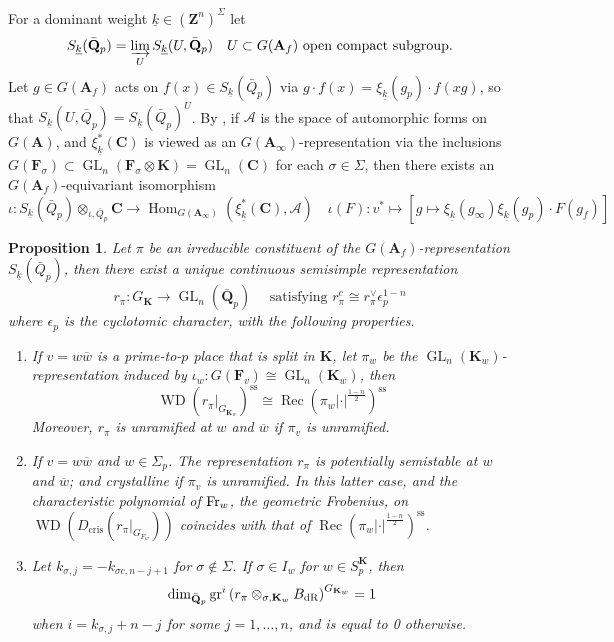 \documentclass[leqno]{amsart}
\newcommand{\wt}[1]{\underline{ #1 }}
\newcommand{\bw}{\overline{w}}
\newcommand{\Fr}{\textnormal{Fr}} %
\newcommand{\dR}{\textnormal{dR}}
\DeclareMathOperator{\WD}{WD}
\DeclareMathOperator{\Rec}{Rec}
\DeclareMathOperator{\GL}{GL}
\newcommand{\Q}{{\mathbf{Q}}}
\newcommand{\Z}{{\mathbf{Z}}}
\newcommand{\C}{\mathbf C}
\newcommand{\A}{\mathbf A}
\newcommand{\F}{{\mathbf{F}}} %
\newcommand{\K}{{\mathbf{K}}} %
\DeclareMathOperator{\Hom}{Hom}
\newtheorem{prop}[thm]{Proposition}
\theoremstyle{definition}
\theoremstyle{remark}
\begin{document}
For a dominant weight $\wt{k}\in (\Z^n)^{\Sigma}$ let
\[
	S_{\wt{k}}(\bar{\Q}_p)=\varinjlim_{U}
	S_{\wt{k}}(U,\bar{\Q}_p)\quad
	U\subset G(\A_f) \text{ open compact subgroup}.
\]
Let $g\in G(\A_f)$ acts on
$f(x)\in S_{\wt{k}}(\bar{Q}_p)$ via 
$g\cdot f(x)=\xi_{\wt{k}}(g_p)\cdot f(xg)$,
so that $S_{\wt{k}}(U,\bar{Q}_p)=S_{\wt{k}}(\bar{Q}_p)^U$.
By \cite[Prop 3.3.2]{CHT},
if $\mathcal{A}$ is 
the space of automorphic forms on $G(\A)$, 
and $\xi_{\wt{k}}^*(\C)$ is viewed as an
$G(\A_\infty)$-representation
via the inclusions
$G(\F_\sigma)\subset \GL_n(\F_\sigma\otimes \K)=\GL_n(\C)$
for each $\sigma\in \Sigma$, then
there exists an $G(\A_f)$-equivariant isomorphism
\[
	\iota\colon S_{\wt{k}}(\bar{Q}_p)\otimes_{\iota,\bar{Q}_p}\C
	\rightarrow \Hom_{G(\A_\infty)} (\xi_{\wt{k}}^*(\C), \mathcal{A})\quad
	\iota(F)\colon v^*\mapsto 
	[g\mapsto \xi_{\wt{k}}(g_\infty)\xi_{\wt{k}}(g_p)\cdot F(g_f)]
\]


\begin{prop}\cite[Prop.2.27]{ger}
	Let $\pi$ be an irreducible constituent of the
	$G(\A_f)$-representation $S_{\wt{k}}(\bar{Q}_p)$,
	then there exist a unique 
	continuous semisimple representation
	\[
	r_\pi: G_\K \rightarrow \GL_n(\bar{\Q}_p)\quad
	\text{ satisfying }
	r_\pi^c \cong r_\pi^{\vee} \epsilon_p^{1-n}
	\]
	where $\epsilon_p$ is the cyclotomic character,
	with the following properties.
\begin{enumerate}[label=(\alph*)]
\item If $v=w\bw$ is a prime-to-$p$ place that is split in $\K$,
let $\pi_w$ be the $\GL_n(\K_w)$-representation
induced by $\iota_w\colon G(\F_v)\cong \GL_n(\K_w)$, then
\[
\WD\left(\left.r_\pi\right|_{G_{\K_w}}\right)^{\mathrm{ss}} \cong
\Rec(\pi_w|\cdot|^{\frac{1-n}{2}})^{\mathrm{ss}}
\]
Moreover, $r_\pi$ is unramified at $w$ and $\bw$ if $\pi_v$ is unramified.
\item If $v=w\bw$ and  $w\in \Sigma_p$.
The representation $r_\pi$ is potentially semistable at $w$ and  $\bw$;
and crystalline if $\pi_v$ is unramified.
In this latter case, 
and the characteristic polynomial of $\Fr_w$, the geometric Frobenius,
on $\WD\left(D_{\mathrm{cris }}\left(\left.r_\pi\right|_{G_{F_w}}\right)\right)$
coincides with that of $\Rec(\pi_w|\cdot|^{\frac{1-n}{2}})^{\mathrm{ss}}$.
\item 
Let $k_{\sigma,j}=-k_{\sigma c, n-j+1}$
for $\sigma\notin \Sigma$.
If $\sigma\in I_w$ for $w\in S_p^\K$, then
\[
\dim_{\bar{\Q}_p}\operatorname{gr}^i
\left(r_\pi \otimes_{\sigma, \K_w} B_{\dR}\right)^{G_{\K_w}}=1
\]
when $i=k_{\sigma, j}+n-j$ 
for some $j=1, \ldots, n$, and is equal to 0 otherwise.
\end{enumerate}
\end{prop}
\end{document}
